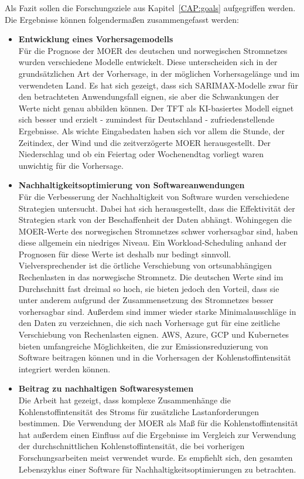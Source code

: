 Als Fazit sollen die Forschungsziele aus Kapitel~\ref{CAP:goals} aufgegriffen werden.
Die Ergebnisse können folgendermaßen zusammengefasst werden:
\begin{itemize}
 \item \textbf{Entwicklung eines Vorhersagemodells} \\
 Für die Prognose der \ac{MOER} des deutschen und norwegischen Stromnetzes wurden verschiedene Modelle entwickelt.
 Diese unterscheiden sich in der grundsätzlichen Art der Vorhersage, in der möglichen Vorhersagelänge und im verwendeten Land.
 Es hat sich gezeigt, dass sich \ac{SARIMAX}-Modelle zwar für den betrachteten Anwendungsfall eignen, sie aber die Schwankungen der Werte nicht genau abbilden können.
 Der \ac{TFT} als \ac{KI}-basiertes Modell eignet sich besser und erzielt - zumindest für Deutschland - zufriedenstellende Ergebnisse.
 Als wichte Eingabedaten haben sich vor allem die Stunde, der Zeitindex, der Wind und die zeitverzögerte \ac{MOER} herausgestellt.
 Der Niederschlag und ob ein Feiertag oder Wochenendtag vorliegt waren unwichtig für die Vorhersage.
 \item \textbf{Nachhaltigkeitsoptimierung von Softwareanwendungen} \\
 Für die Verbesserung der Nachhaltigkeit von Software wurden verschiedene Strategien untersucht.
 Dabei hat sich herausgestellt, dass die Effektivität der Strategien stark von der Beschaffenheit der Daten abhängt.
 Wohingegen die \ac{MOER}-Werte des norwegischen Stromnetzes schwer vorhersagbar sind, haben diese allgemein ein niedriges Niveau.
 Ein Workload-Scheduling anhand der Prognosen für diese Werte ist deshalb nur bedingt sinnvoll.
 Vielversprechender ist die örtliche Verschiebung von ortsunabhängigen Rechenlasten in das norwegische Stromnetz.
 Die deutschen Werte sind im Durchschnitt fast dreimal so hoch, sie bieten jedoch den Vorteil, dass sie unter anderem aufgrund der Zusammensetzung des Stromnetzes besser vorhersagbar sind.
 Außerdem sind immer wieder starke Minimalausschläge in den Daten zu verzeichnen, die sich nach Vorhersage gut für eine zeitliche Verschiebung von Rechenlasten eignen.
 \ac{AWS}, Azure, \ac{GCP} und Kubernetes bieten umfangreiche Möglichkeiten, die zur Emissionsreduzierung von Software beitragen können und in die Vorhersagen der Kohlenstoffintensität integriert werden können.
 \item \textbf{Beitrag zu nachhaltigen Softwaresystemen} \\
 Die Arbeit hat gezeigt, dass komplexe Zusammenhänge die Kohlenstoffintensität des Stroms für zusätzliche Lastanforderungen bestimmen.
 Die Verwendung der \ac{MOER} als Maß für die Kohlenstoffintensität hat außerdem einen Einfluss auf die Ergebnisse im Vergleich zur Verwendung der durchschnittlichen Kohlenstoffintensität, die bei vorherigen Forschungsarbeiten meist verwendet wurde.
 Es empfiehlt sich, den gesamten Lebenszyklus einer Software für Nachhaltigkeitsoptimierungen zu betrachten.
\end{itemize}
